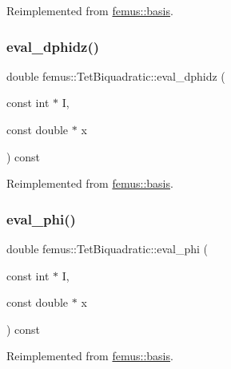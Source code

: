 Reimplemented from \mbox{\hyperlink{classfemus_1_1basis_a2819fac9aae797156b9efec8a0b85cc1}{femus\+::basis}}.

\mbox{\label{classfemus_1_1_tet_biquadratic_a9e6a9c61044c0cc4ab68ea0ef6e83f80}} 
\subsubsection{\texorpdfstring{eval\+\_\+dphidz()}{eval\_dphidz()}}
{\footnotesize\ttfamily double femus\+::\+Tet\+Biquadratic\+::eval\+\_\+dphidz (\begin{DoxyParamCaption}\item[{const int $\ast$}]{I,  }\item[{const double $\ast$}]{x }\end{DoxyParamCaption}) const\hspace{0.3cm}{\ttfamily [virtual]}}



Reimplemented from \mbox{\hyperlink{classfemus_1_1basis_affd9927f6e25e264108219d862b8cb3d}{femus\+::basis}}.

\mbox{\label{classfemus_1_1_tet_biquadratic_a4f5066f00ab4577ab2fbdff72b47b4a0}} 
\subsubsection{\texorpdfstring{eval\+\_\+phi()}{eval\_phi()}}
{\footnotesize\ttfamily double femus\+::\+Tet\+Biquadratic\+::eval\+\_\+phi (\begin{DoxyParamCaption}\item[{const int $\ast$}]{I,  }\item[{const double $\ast$}]{x }\end{DoxyParamCaption}) const\hspace{0.3cm}{\ttfamily [virtual]}}



Reimplemented from \mbox{\hyperlink{classfemus_1_1basis_a89b0797cdccffae5ff6d059b32016ae5}{femus\+::basis}}.


